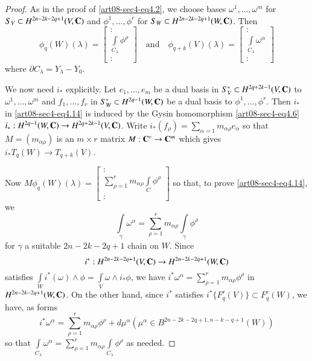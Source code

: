 \begin{proof}
As in the proof of \eqref{art08-sec4-eq4.2}, we choose bases $\omega^{1},\ldots,\omega^{m}$ for $S_{V}\subset H^{2n-2k-2q+1}(V,\mathbf{C})$ and $\phi^{1},\ldots,\phi^{r}$ for $S_{W}\subset H^{2n-2k-2q+1}(W,\mathbf{C})$. Then
$$
\phi_{q}(W)(\lambda)=
\begin{bmatrix}
:\\
\int\limits_{C_{\lambda}}\phi^{\rho}\\
:
\end{bmatrix}
\text{~~ and~~ } \phi_{q+k}(V)(\lambda)=
\begin{bmatrix}
:\\
\int\limits_{C_{\lambda}}\omega^{\alpha}\\
:
\end{bmatrix}
$$
where $\partial C_{\lambda}=Y_{\lambda}-Y_{0}$.

We now need $i_{*}$ explicitly. Let $e_{1},\ldots,e_{m}$ be a dual basis in $S^{*}_{V}\subset H^{2q+2k-1}(V,\mathbf{C})$ to $\omega^{1},\ldots,\omega^{m}$ and $f_{1},\ldots,f_{r}$ in $S^{*}_{W}\subset H^{2q-1}(W,\mathbf{C})$ be a dual basis to $\phi^{1},\ldots,\phi^{r}$. Then $i_{*}$ in \eqref{art08-sec4-eq4.14} is induced by the Gysin homomorphism \eqref{art08-sec4-eq4.6} $i_{*}:H^{2q-1}(W,\mathbf{C})\to H^{2q+2k-1}(V,\mathbf{C})$. Write $i_{*}(f_{\rho})=\sum\limits_{\alpha=1}m_{\alpha\rho}e_{\alpha}$ so that $M=(m_{\alpha\rho})$ is an $m\times r$ matrix $M:\mathbf{C}^{r}\to \mathbf{C}^{m}$ which gives $i_{*}T_{q}(W)\to T_{q+k}(V)$.

Now $M\phi_{q}(W)(\lambda)=\left[\begin{smallmatrix}:\\ \sum\limits^{r}_{\rho=1}m_{\alpha\rho}\int\limits_{C}\phi^{\rho}\\ :\end{smallmatrix}\right]$ so that, to prove \eqref{art08-sec4-eq4.14}, we 
\begin{equation*}
\int\limits_{\gamma}\omega^{\alpha}=\sum\limits^{r}_{\rho=1}m_{\alpha\rho}\int\limits_{\gamma}\phi^{\rho}\tag{4.15}\label{art08-sec4-eq4.15}
\end{equation*}
for $\gamma$ a suitable $2n-2k-2q+1$ chain on $W$. Since
$$
i^{*}:H^{2n-2k-2q+1}(V,\mathbf{C})\to H^{2n-2k-2q+1}(W,\mathbf{C})
$$
satisfies $\int\limits_{W}i^{*}(\omega)\wedge \phi=\int\limits_{V}\omega \wedge i_{*}\phi$, we have $i^{*}\omega^{\alpha}=\sum\limits^{r}_{\rho=1}m_{\alpha\rho}\phi^{\rho}$ in $H^{2n-2k-2q+1}(W,\mathbf{C})$. On the other hand, since $i^{*}$ satisfies $i^{*}\{F^{r}_{q}(V)\}\subset F^{r}_{q}(W)$, we have, as forms 
$$
i^{*}\omega^{\alpha}=\sum\limits^{r}_{\rho=1}m_{\alpha\rho}\phi^{\rho}+d\mu^{\alpha}(\mu^{\alpha}\in B^{2n-2k-2q+1, n-k-q+1}(W))
$$ 
so that $\int\limits_{C_{\lambda}}\omega^{\alpha}=\sum\limits^{r}_{\rho=1}m_{\alpha\rho}\int\limits_{C_{\lambda}}\phi^{\rho}$ as needed.
\end{proof}


